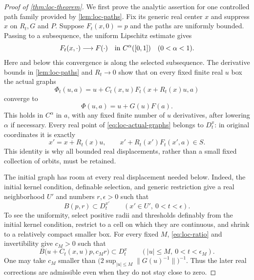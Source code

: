 \begin{proof}[Proof of \cref{thm:loc-theorem}]
We first prove the analytic assertion for one controlled path family provided by \cref{lem:loc-paths}.  Fix its generic real center $x$ and suppress $x$ on $R_t,G$ and $P$.  Suppose $F_t(x,0)=p$ and the paths are uniformly bounded.  Passing to a subsequence, the uniform Lipschitz estimate gives
\[
                  F_t(x,\cdot)\longrightarrow F(\cdot)
                        \quad\hbox{in }C^\alpha([0,1])
                        \quad(0<\alpha<1).
\]
Here and below this convergence is along the selected subsequence. The derivative bounds in \cref{lem:loc-paths} and $R_t\to0$ show that on every fixed finite real $u$ box the actual graphs
\begin{equation}\label{eq:loc-actual-graphs}
 \Phi_t(u,a)=u+C_t(x,u)F_t(x+R_t(x)u,a)
\end{equation}
converge to
\begin{equation}\label{eq:loc-limit-graphs}
                       \Phi(u,a)=u+G(u)F(a).
\end{equation}
This holds in $C^\alpha$ in $a$, with any fixed finite number of $u$ derivatives, after lowering $\alpha$ if necessary.  Every real point of \eqref{eq:loc-actual-graphs} belongs to $D_t^x$: in original coordinates it is exactly
\[
 x'=x+R_t(x)u,\qquad x'+R_t(x')F_t(x',a)\in S.
\]
This identity is why all bounded real displacements, rather than a small fixed collection of orbits, must be retained.

The initial graph has room at every real displacement needed below. Indeed, the initial kernel condition, definable selection, and generic restriction give a real neighborhood $U'$ and numbers $r,\epsilon>0$ such that
\begin{equation}\label{eq:loc-uniform-start}
 B(p,r)\subset D_t^{x'}
       \qquad(x'\in U',\ 0<t<\epsilon).
\end{equation}
To see the uniformity, select positive radii and thresholds definably from the initial kernel condition, restrict to a cell on which they are continuous, and shrink to a relatively compact smaller box. For every fixed $M$, \eqref{eq:loc-ratio} and invertibility give $c_M>0$ such that
\begin{equation}\label{eq:loc-orbit-room}
 B\bigl(u+C_t(x,u)p,c_Mr\bigr)\subset D_t^x
               \qquad(|u|\leq M,\ 0<t<\epsilon_M).
\end{equation}
One may take $c_M$ smaller than $\bigl(2\sup_{|u|\leq M}\|G(u)^{-1}\|\bigr)^{-1}$. Thus the later real corrections are admissible even when they do not stay close to zero.


\end{proof}

